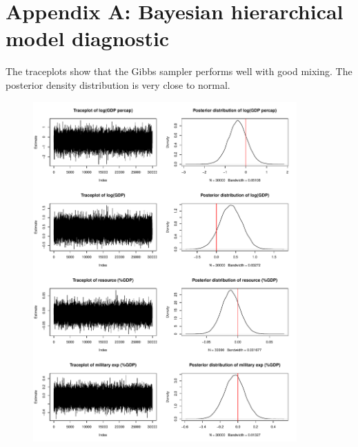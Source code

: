 \section{Appendix A: Bayesian hierarchical model diagnostic}
\label{sec:modeldiagnostic}

The traceplots show that the Gibbs sampler performs well with good mixing. The posterior density distribution is very close to normal.

\begin{figure}[H]
    \centering
    \includegraphics[width=0.9\textwidth]{../fig/mcmc_diagnostic1}
    \label{fig:mcmc_diagnostic1}
\end{figure}

